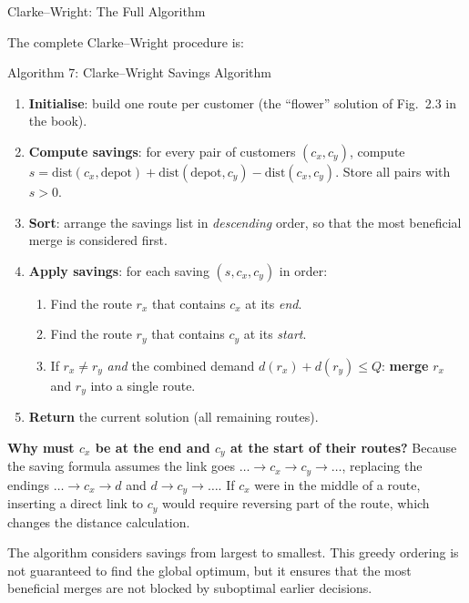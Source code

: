 \documentclass[aspectratio=169,10pt]{beamer}
\begin{document}
\begin{frame}[allowframebreaks]{Clarke--Wright: The Full Algorithm}

  The complete Clarke--Wright procedure is:

  \begin{block}{Algorithm 7: Clarke--Wright Savings Algorithm}
    \begin{enumerate}
      \item \textbf{Initialise}: build one route per customer
        (the ``flower'' solution of Fig.~2.3 in the book).
      \item \textbf{Compute savings}: for every pair of customers $(c_x, c_y)$,
        compute $s = \mathrm{dist}(c_x, \text{depot}) + \mathrm{dist}(\text{depot}, c_y) - \mathrm{dist}(c_x, c_y)$.
        Store all pairs with $s > 0$.
      \item \textbf{Sort}: arrange the savings list in \emph{descending} order,
        so that the most beneficial merge is considered first.
      \item \textbf{Apply savings}: for each saving $(s, c_x, c_y)$ in order:
        \begin{enumerate}
          \item Find the route $r_x$ that contains $c_x$ at its \emph{end}.
          \item Find the route $r_y$ that contains $c_y$ at its \emph{start}.
          \item If $r_x \neq r_y$ \emph{and}
            the combined demand $d(r_x) + d(r_y) \leq Q$:
            \textbf{merge} $r_x$ and $r_y$ into a single route.
        \end{enumerate}
      \item \textbf{Return} the current solution (all remaining routes).
    \end{enumerate}
  \end{block}

  \framebreak

  \textbf{Why must $c_x$ be at the end and $c_y$ at the start of their routes?}
  Because the saving formula assumes the link goes $\ldots \to c_x \to c_y \to \ldots$,
  replacing the endings $\ldots \to c_x \to d$ and $d \to c_y \to \ldots$.
  If $c_x$ were in the middle of a route, inserting a direct link to $c_y$
  would require reversing part of the route, which changes the distance
  calculation.

  \bigskip
  The algorithm considers savings from largest to smallest.  This greedy
  ordering is not guaranteed to find the global optimum, but it ensures that
  the most beneficial merges are not blocked by suboptimal earlier decisions.


\end{frame}
\end{document}
